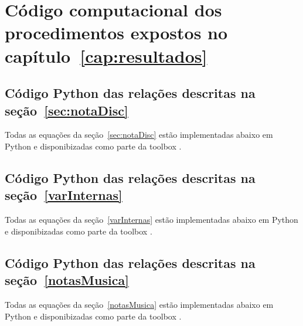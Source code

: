 \chapter{Código computacional dos procedimentos expostos no capítulo~\ref{cap:resultados}}
\label{cap:codigoProc}

\section{Código Python das relações descritas na seção~\ref{sec:notaDisc}}\label{sec:cod1}
Todas as equações da seção~\ref{sec:notaDisc} estão implementadas abaixo em Python e disponibizadas como parte da toolbox \massa.\cite{MASSA}


\clearpage


\section{Código Python das relações descritas na seção~\ref{varInternas}}\label{sec:cod2}
Todas as equações da seção~\ref{varInternas} estão implementadas abaixo em Python e disponibizadas como parte da toolbox \massa.\cite{MASSA}



\clearpage

\section{Código Python das relações descritas na seção~\ref{notasMusica}}\label{sec:cod3}
Todas as equações da seção~\ref{notasMusica} estão implementadas abaixo em Python e disponibizadas como parte da toolbox \massa.\cite{MASSA}

